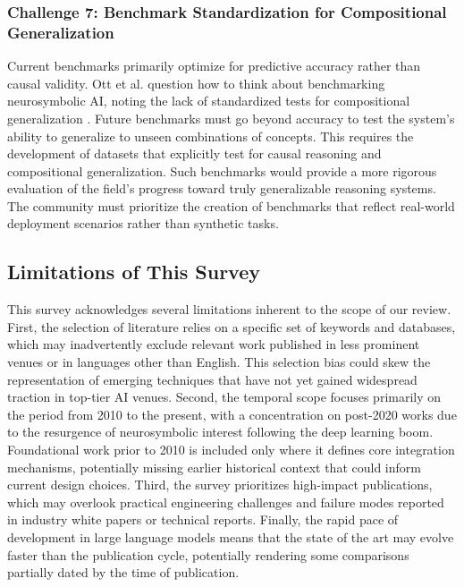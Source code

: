 \documentclass{article}
\begin{document}
\subsubsection{Challenge 7: Benchmark Standardization for Compositional Generalization}

\label{sec:challenge_7_benchmark_standardization_fo}

Current benchmarks primarily optimize for predictive accuracy rather than causal validity. Ott et al. question how to think about benchmarking neurosymbolic AI, noting the lack of standardized tests for compositional generalization \cite{ott2023think}. Future benchmarks must go beyond accuracy to test the system's ability to generalize to unseen combinations of concepts. This requires the development of datasets that explicitly test for causal reasoning and compositional generalization. Such benchmarks would provide a more rigorous evaluation of the field's progress toward truly generalizable reasoning systems. The community must prioritize the creation of benchmarks that reflect real-world deployment scenarios rather than synthetic tasks.

\subsection{Limitations of This Survey}

\label{sec:limitations_of_this_survey}

This survey acknowledges several limitations inherent to the scope of our review. First, the selection of literature relies on a specific set of keywords and databases, which may inadvertently exclude relevant work published in less prominent venues or in languages other than English. This selection bias could skew the representation of emerging techniques that have not yet gained widespread traction in top-tier AI venues. Second, the temporal scope focuses primarily on the period from 2010 to the present, with a concentration on post-2020 works due to the resurgence of neurosymbolic interest following the deep learning boom. Foundational work prior to 2010 is included only where it defines core integration mechanisms, potentially missing earlier historical context that could inform current design choices. Third, the survey prioritizes high-impact publications, which may overlook practical engineering challenges and failure modes reported in industry white papers or technical reports. Finally, the rapid pace of development in large language models means that the state of the art may evolve faster than the publication cycle, potentially rendering some comparisons partially dated by the time of publication.
\end{document}
